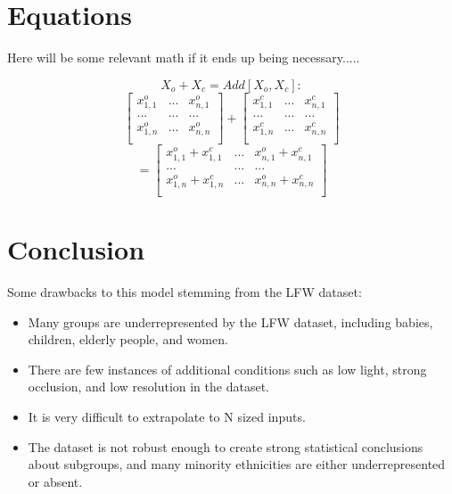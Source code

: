\documentclass[conference]{IEEEtran}
\begin{document}
\section{Equations}
Here will be some relevant math if it ends up being necessary.....

\begin{equation}
   X_o+X_c = Add[X_o,X_c] :
   \label{eq:2}
\end{equation}
$$
\begin{bmatrix}
x_{1,1}^o & ... & x_{n,1}^o\\
... & ... & ...\\
x_{1,n}^o & ... & x_{n,n}^o\\
\end{bmatrix}
+
\begin{bmatrix}
x_{1,1}^c & ... & x_{n,1}^c\\
... & ... & ...\\
x_{1,n}^c & ... & x_{n,n}^c\\
\end{bmatrix}
$$
$$
=
\begin{bmatrix}
x_{1,1}^o+x_{1,1}^c & ... & x_{n,1}^o+x_{n,1}^c\\
... & ... & ...\\
x_{1,n}^o+x_{1,n}^c & ... & x_{n,n}^o+x_{n,n}^c\\
\end{bmatrix}
$$





\section{Conclusion}


Some drawbacks to this model stemming from the LFW dataset:
\begin{itemize}
    \item Many groups are underrepresented by the LFW dataset, including babies, children, elderly people, and women.
    \item There are few instances of additional conditions such as low light, strong occlusion, and low resolution in the dataset.
    \item It is very difficult to extrapolate to N sized inputs.
    \item The dataset is not robust enough to create strong statistical conclusions about subgroups, and many minority ethnicities are either underrepresented or absent.
\end{itemize}
\end{document}
